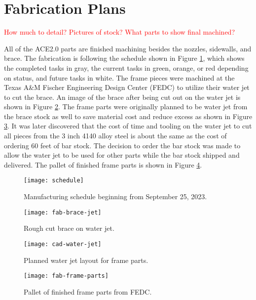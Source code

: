 \section{Fabrication Plans}

\textcolor{red}{How much to detail? Pictures of stock? What parts to show final machined?}

All of the ACE2.0 parts are finished machining besides the nozzles, sidewalls, and brace. The fabrication is following the schedule shown in Figure \ref{fig:schedule}, which shows the completed tasks in gray, the current tasks in green, orange, or red depending on status, and future tasks in white. The frame pieces were machined at the Texas A\&M Fischer Engineering Design Center (FEDC) to utilize their water jet to cut the brace. An image of the brace after being cut out on the water jet is shown in Figure \ref{fig:fab-brace-jet}. The frame parts were originally planned to be water jet from the brace stock as well to save material cost and reduce excess as shown in Figure \ref{fig:cad-water-jet}. It was later discovered that the cost of time and tooling on the water jet to cut all pieces from the 3 inch 4140 alloy steel is about the same as the cost of ordering 60 feet of bar stock. The decision to order the bar stock was made to allow the water jet to be used for other parts while the bar stock shipped and delivered. The pallet of finished frame parts is shown in Figure \ref{fig:fab-frame-parts}.

\begin{figure}[ht!]
    \centering
    \texttt{[image: schedule]}
    \caption{Manufacturing schedule beginning from September 25, 2023.}
    \label{fig:schedule}
\end{figure}

\begin{figure}[ht!]
    \centering
    \texttt{[image: fab-brace-jet]}
    \caption{Rough cut brace on water jet.}
    \label{fig:fab-brace-jet}
\end{figure}

\begin{figure}[ht!]
    \centering
    \texttt{[image: cad-water-jet]}
    \caption{Planned water jet layout for frame parts.}
    \label{fig:cad-water-jet}
\end{figure}

\begin{figure}[ht!]
    \centering
    \texttt{[image: fab-frame-parts]}
    \caption{Pallet of finished frame parts from FEDC.}
    \label{fig:fab-frame-parts}
\end{figure}

